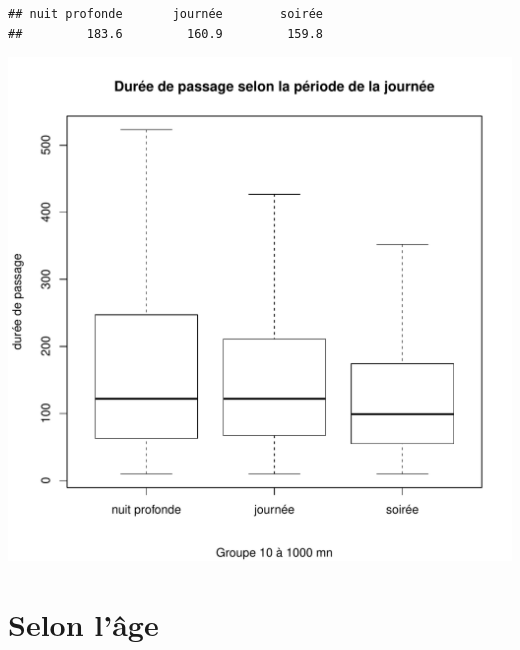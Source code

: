 \documentclass[12pt,english,french,twoside]{report}\usepackage[]{graphicx}\usepackage[]{color}
\makeatletter
\def\maxwidth{ %
  \ifdim\Gin@nat@width>\linewidth
    \linewidth
  \else
    \Gin@nat@width
  \fi
}
\newenvironment{kframe}{%
 \def\at@end@of@kframe{}%
 \ifinner\ifhmode%
  \def\at@end@of@kframe{\end{minipage}}%
  \begin{minipage}{\columnwidth}%
 \fi\fi%
 \def\FrameCommand##1{\hskip\@totalleftmargin \hskip-\fboxsep
 \colorbox{shadecolor}{##1}\hskip-\fboxsep
     \hskip-\linewidth \hskip-\@totalleftmargin \hskip\columnwidth}%
 \MakeFramed {\advance\hsize-\width
   \@totalleftmargin\z@ \linewidth\hsize
   \@setminipage}}%
 {\par\unskip\endMakeFramed%
 \at@end@of@kframe}
\newenvironment{knitrout}{}{} %
\makeatother
\begin{document}
\begin{knitrout}
\begin{kframe}\begin{verbatim}
## nuit profonde       journée        soirée 
##         183.6         160.9         159.8
\end{verbatim}
\end{kframe}
\includegraphics[width=\maxwidth]{figure/duree_heure3} 

\end{knitrout}


\section*{Selon l'âge}
\end{document}
